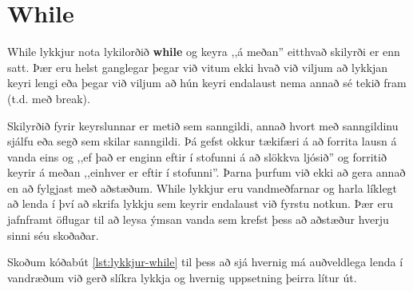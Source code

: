 \section{While}
While lykkjur nota lykilorðið \textbf{while} og keyra ,,á meðan'' eitthvað skilyrði er enn satt.
Þær eru helst ganglegar þegar við vitum ekki hvað við viljum að lykkjan keyri lengi eða þegar við viljum að hún keyri endalaust nema annað sé tekið fram (t.d. með break).

Skilyrðið fyrir keyrslunnar er metið sem sanngildi, annað hvort með sanngildinu sjálfu eða segð sem skilar sanngildi.
Þá gefst okkur tækifæri á að forrita lausn á vanda eins og ,,ef það er enginn eftir í stofunni á að slökkva ljósið'' og forritið keyrir á meðan ,,einhver er eftir í stofunni''.
Þarna þurfum við ekki að gera annað en að fylgjast með aðstæðum.
While lykkjur eru vandmeðfarnar og harla líklegt að lenda í því að skrifa lykkju sem keyrir endalaust við fyrstu notkun.
Þær eru jafnframt öflugar til að leysa ýmsan vanda sem krefst þess að aðstæður hverju sinni séu skoðaðar.

Skoðum kóðabút \ref{lst:lykkjur-while} til þess að sjá hvernig má auðveldlega lenda í vandræðum við gerð slíkra lykkja og hvernig uppsetning þeirra lítur út.


